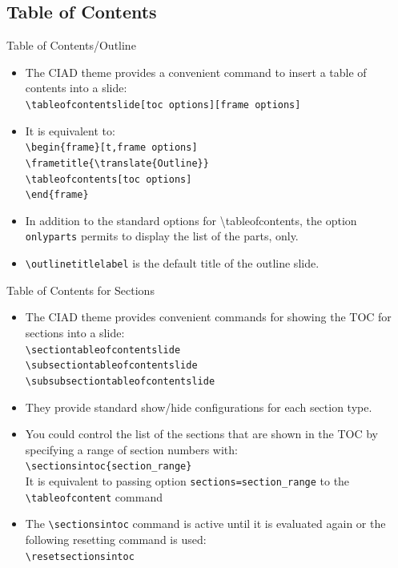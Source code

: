 \documentclass[english,sectioncirclenumberstyle]{ciadbeamer}
\begin{document}
\subsection{Table of Contents}

\begin{frame}{Table of Contents/Outline}
	\begin{itemize}
	\item The CIAD theme provides a convenient command to insert a table of contents into a slide: \\
		\texttt{{\textbackslash}tableofcontentslide[toc options][frame options]}
	\vspace{1em}
	\item It is equivalent to: \\
		\texttt{{\textbackslash}begin\{frame\}[t,frame options]} \\
		\texttt{{\textbackslash}frametitle\{{\textbackslash}translate\{Outline\}\}} \\
		\texttt{{\textbackslash}tableofcontents[toc options]} \\
		\texttt{{\textbackslash}end\{frame\}}
	\vspace{1em}
	\item In addition to the standard options for {{\textbackslash}tableofcontents}, the option \texttt{onlyparts} permits to display the list of the parts, only.
	\item \texttt{{\textbackslash}outlinetitlelabel} is the default title of the outline slide.
	\end{itemize}
\end{frame}

\begin{frame}{Table of Contents for Sections}
	\begin{itemize}
	\item The CIAD theme provides convenient commands for showing the TOC for sections into a slide: \\
		\texttt{{\textbackslash}sectiontableofcontentslide} \\
		\texttt{{\textbackslash}subsectiontableofcontentslide} \\
		\texttt{{\textbackslash}subsubsectiontableofcontentslide}
	\item They provide standard show/hide configurations for each section type.
	\item You could control the list of the sections that are shown in the TOC by specifying a range of section numbers with: \\
		\texttt{{\textbackslash}sectionsintoc\{section\_range\}} \\
		It is equivalent to passing option \texttt{sections={section\_range}} to the \texttt{{\textbackslash}tableofcontent} command
	\item The \texttt{{\textbackslash}sectionsintoc} command is active until it is evaluated again or the following resetting command is used: \\
		\texttt{{\textbackslash}resetsectionsintoc}
	\end{itemize}
\end{frame}
\end{document}
